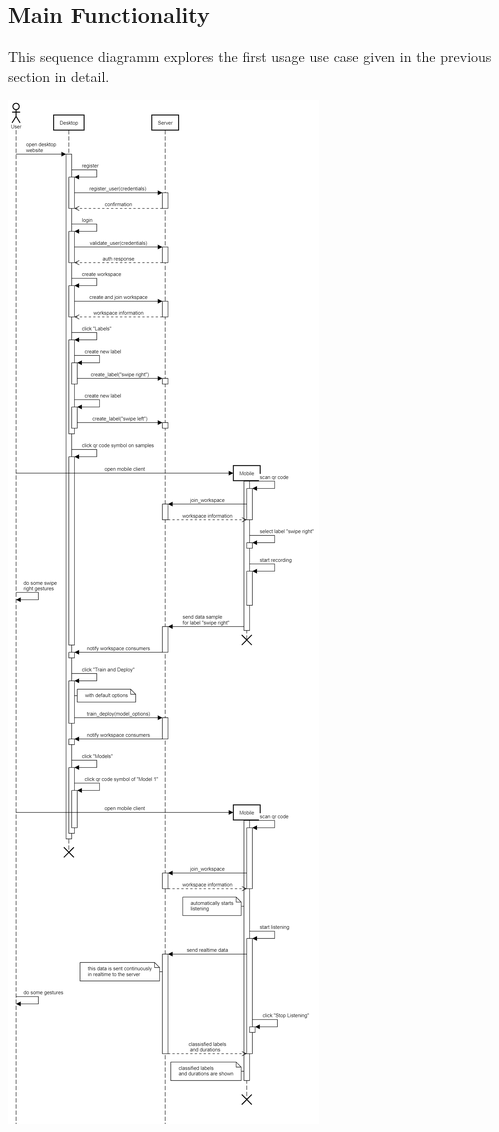 \subsection{Main Functionality}
This sequence diagramm explores the first usage use case given in the previous section in detail. 

\begin{center}
    \includegraphics[width=\textwidth,trim={0 66cm 0 0},clip]{charts/sequencefrank.png}
\end{center}
